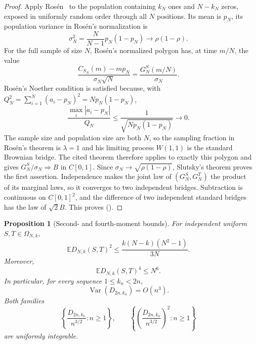 \documentclass[twoside,10pt]{article}
\numberwithin{equation}{section}
\theoremstyle{slbody}
\newtheorem{proposition}[theorem]{Proposition}
\theoremstyle{definition}
\theoremstyle{remark}
\newcommand{\E}{\mathbb{E}}
\newcommand{\Var}{\operatorname{Var}}
\newcommand{\1}{\mathbf{1}}
\renewcommand{\eqref}[1]{%
  \textup{{\normalfont(\oldstylenums{\ref{#1}}}\normalfont)}}
\begin{document}
\begin{proof}
Apply Ros\'en~\cite[Theorem~13.1, pp.~408--411]{Rosen} to the population
containing $k_N$ ones and $N-k_N$ zeros, exposed in uniformly random order
through all $N$ positions.  Its mean is $p_N$, its population
variance in Ros\'en's normalization is
\[
 \sigma_N^2=\frac{N}{N-1}p_N(1-p_N)
 \longrightarrow\rho(1-\rho).
\]
For the full sample of size $N$, Ros\'en's normalized polygon has, at time
$m/N$, the value
\[
 \frac{C_{S_N}(m)-mp_N}{\sigma_N\sqrt N}
 =\frac{G_N^S(m/N)}{\sigma_N}.
\]
Ros\'en's Noether condition is satisfied because, with
$Q_N^2=\sum_{i=1}^N(a_i-p_N)^2=Np_N(1-p_N)$,
\[
 \frac{\max_i|a_i-p_N|}{Q_N}
 \leq\frac{1}{\sqrt{Np_N(1-p_N)}}\longrightarrow0.
\]
The sample size and population size are both $N$, so the sampling fraction in
Ros\'en's theorem is $\lambda=1$ and his limiting process $W(1,1)$ is the
standard Brownian bridge.  The cited theorem therefore applies to exactly this
polygon and gives $G_N^S/\sigma_N\Rightarrow B$ in $C[0,1]$.  Since
$\sigma_N\to\sqrt{\rho(1-\rho)}$, Slutsky's theorem proves the first assertion.
Independence makes the joint law of $(G_N^S,G_N^T)$ the product of its
marginal laws, so it converges to two independent bridges.  Subtraction is
continuous on $C[0,1]^2$, and the difference of two independent standard
bridges has the law of $\sqrt2B$.  This proves
\eqref{eq:difference-bridge}.
\end{proof}

\begin{proposition}[Second- and fourth-moment bounds]\label{prop:second-moment}
For independent uniform $S,T\in\Omega_{N,k}$,
\begin{equation}\label{eq:second-moment-bound}
 \E D_{N,k}(S,T)^2
 \leq \frac{k(N-k)(N^2-1)}{3N}.
\end{equation}
Moreover,
\begin{equation}\label{eq:fourth-moment-bound}
 \E D_{N,k}(S,T)^4\leq N^6.
\end{equation}
In particular, for every sequence $1\leq k_n<2n$,
\[
 \Var(D_{2n,k_n})=O(n^3).
\]
Both families
\[
 \left\{\frac{D_{2n,k_n}}{n^{3/2}}:n\geq1\right\},
 \qquad
 \left\{\left(\frac{D_{2n,k_n}}{n^{3/2}}\right)^2:n\geq1\right\}
\]
are uniformly integrable.
\end{proposition}
\end{document}

